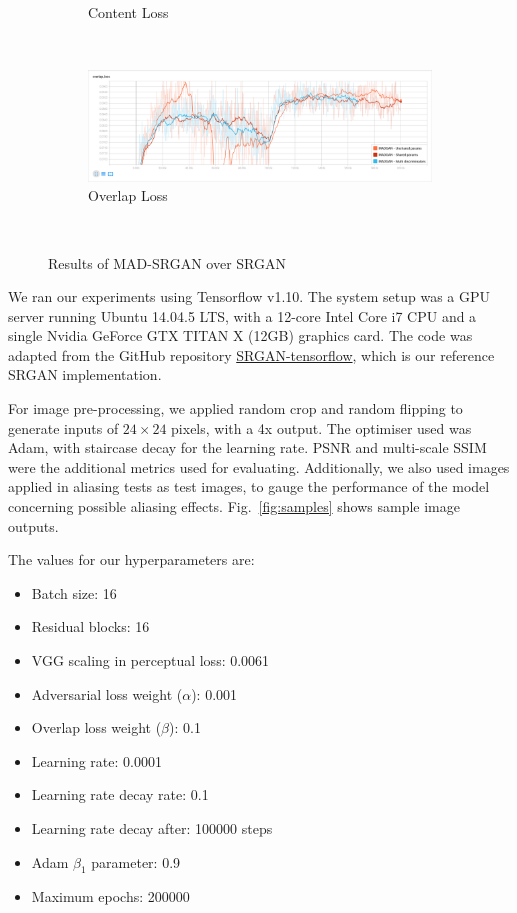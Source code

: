 \documentclass[12pt,a4paper,twocolumn]{article}
\begin{document}
\begin{figure}
\begin{subfigure}{0.48\textwidth}
                \caption{Content Loss}
            \end{subfigure}\\[5mm]
            \begin{subfigure}{0.48\textwidth}
                \includegraphics[width=\textwidth]{images/ovrl-loss.png}
                \caption{Overlap Loss}
            \end{subfigure}\\[2mm]
            \caption{Results of MAD-SRGAN over SRGAN}
            \label{fig:results}
        \end{figure}

        We ran our experiments using Tensorflow \cite{tensorflow} v1.10.
        The system setup was a GPU server running Ubuntu 14.04.5 LTS, with a 12-core Intel Core i7 CPU and a single Nvidia GeForce GTX TITAN X (12GB) graphics card.
        The code was adapted from the GitHub repository \href{https://github.com/brade31919/SRGAN-tensorflow}{SRGAN-tensorflow}, which is our reference SRGAN implementation.

        For image pre-processing, we applied random crop and random flipping to generate inputs of $24 \times 24$ pixels, with a 4x output.
        The optimiser used was Adam, with staircase decay for the learning rate.
        PSNR and multi-scale SSIM \cite{msssim} were the additional metrics used for evaluating.
        Additionally, we also used images applied in aliasing tests as test images, to gauge the performance of the model concerning possible aliasing effects.
        Fig.~\ref{fig:samples} shows sample image outputs.

        The values for our hyperparameters are:
        \begin{itemize}
            \item Batch size: 16
            \item Residual blocks: 16
            \item VGG scaling in perceptual loss: 0.0061
            \item Adversarial loss weight ($\alpha$): 0.001
            \item Overlap loss weight ($\beta$): 0.1
            \item Learning rate: 0.0001
            \item Learning rate decay rate: 0.1
            \item Learning rate decay after: 100000 steps
            \item Adam $\beta_1$ parameter: 0.9
            \item Maximum epochs: 200000
        \end{itemize}
\end{document}

